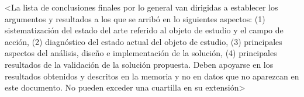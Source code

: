 \conclusions
<La lista de conclusiones finales por lo general van dirigidas a establecer los argumentos y resultados a los que se arribó en lo siguientes aspectos: (1) sistematización del estado del arte referido al objeto de estudio y el campo de acción, (2) diagnóstico del estado actual del objeto de estudio, (3) principales aspectos del análisis, diseño e implementación de la solución, (4) principales resultados de la validación de la solución propuesta. Deben apoyarse en los resultados obtenidos y descritos en la memoria y no en datos que no aparezcan en este documento. No pueden exceder una cuartilla en su extensión>